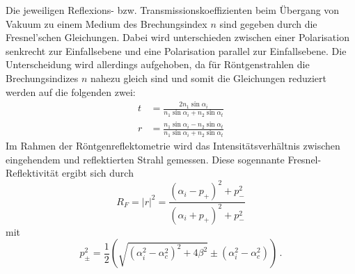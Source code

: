         Die jeweiligen Reflexions- bzw. Transmissionskoeffizienten beim Übergang von Vakuum zu einem Medium des Brechungsindex $n$
        sind gegeben durch die Fresnel'schen Gleichungen. Dabei wird unterschieden zwischen einer Polarisation senkrecht zur Einfallsebene und eine Polarisation parallel zur Einfallsebene.
        Die Unterscheidung wird allerdings aufgehoben, da für Röntgenstrahlen die Brechungsindizes $n$ nahezu gleich sind und somit die Gleichungen reduziert werden auf die folgenden zwei:
        \begin{align}
            t&=\frac{2n_1\sin\alpha_i}{n_1\sin\alpha_i+n_2\sin\alpha_t} \\
            r&=\frac{n_1\sin\alpha_i-n_2\sin\alpha_t}{n_1\sin\alpha_i+n_2\sin\alpha_t}
        \end{align}
        Im Rahmen der Röntgenreflektometrie wird das Intensitätsverhältnis zwischen eingehendem und reflektierten Strahl gemessen.
        Diese sogennante Fresnel-Reflektivität ergibt sich durch
        \begin{equation}
            R_F=\vert r\vert^2=\frac{\left(\alpha_i-p_+\right)^2+p_-^2}{\left(\alpha_i+p_+\right)^2+p_-^2}
            \label{eqn:R_F}
        \end{equation}
        mit
        \begin{equation}
            p_\pm^2=\frac{1}{2}\left(\sqrt{\left(\alpha_i^2-\alpha_c^2\right)^2+4\beta^2}\pm\left(\alpha_i^2-\alpha_c^2\right)\right) \, .
            \label{eqn:p}
        \end{equation}
